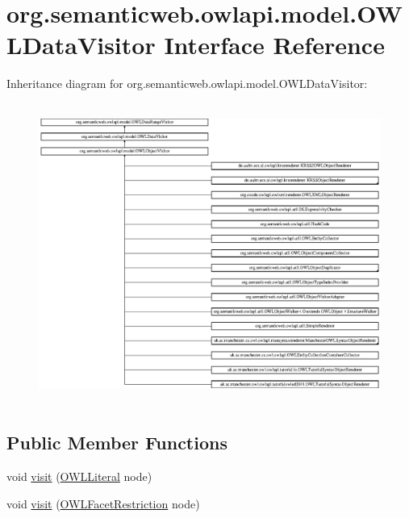 \hypertarget{interfaceorg_1_1semanticweb_1_1owlapi_1_1model_1_1_o_w_l_data_visitor}{\section{org.\-semanticweb.\-owlapi.\-model.\-O\-W\-L\-Data\-Visitor Interface Reference}
\label{interfaceorg_1_1semanticweb_1_1owlapi_1_1model_1_1_o_w_l_data_visitor}
}
Inheritance diagram for org.\-semanticweb.\-owlapi.\-model.\-O\-W\-L\-Data\-Visitor\-:\begin{figure}[H]
\begin{center}
\leavevmode
\includegraphics[height=9.851851cm]{interfaceorg_1_1semanticweb_1_1owlapi_1_1model_1_1_o_w_l_data_visitor}
\end{center}
\end{figure}
\subsection*{Public Member Functions}
\begin{DoxyCompactItemize}
\item 
void \hyperlink{interfaceorg_1_1semanticweb_1_1owlapi_1_1model_1_1_o_w_l_data_visitor_ac4776da358348703ad3e2b596952b13a}{visit} (\hyperlink{interfaceorg_1_1semanticweb_1_1owlapi_1_1model_1_1_o_w_l_literal}{O\-W\-L\-Literal} node)
\item 
void \hyperlink{interfaceorg_1_1semanticweb_1_1owlapi_1_1model_1_1_o_w_l_data_visitor_afa3bc0c95e6f894be8b695c709f79191}{visit} (\hyperlink{interfaceorg_1_1semanticweb_1_1owlapi_1_1model_1_1_o_w_l_facet_restriction}{O\-W\-L\-Facet\-Restriction} node)
\end{DoxyCompactItemize}


